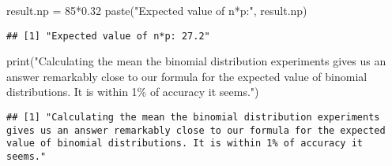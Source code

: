 \documentclass[
]{article}
\newenvironment{Shaded}{\begin{snugshade}}{\end{snugshade}}
\newcommand{\DecValTok}[1]{\textcolor[rgb]{0.00,0.00,0.81}{#1}}
\newcommand{\FloatTok}[1]{\textcolor[rgb]{0.00,0.00,0.81}{#1}}
\newcommand{\FunctionTok}[1]{\textcolor[rgb]{0.00,0.00,0.00}{#1}}
\newcommand{\NormalTok}[1]{#1}
\newcommand{\OtherTok}[1]{\textcolor[rgb]{0.56,0.35,0.01}{#1}}
\newcommand{\SpecialCharTok}[1]{\textcolor[rgb]{0.00,0.00,0.00}{#1}}
\newcommand{\StringTok}[1]{\textcolor[rgb]{0.31,0.60,0.02}{#1}}
\begin{document}
\begin{Shaded}
\begin{Highlighting}[]
\NormalTok{result.np }\OtherTok{=} \DecValTok{85}\SpecialCharTok{*}\FloatTok{0.32}
\FunctionTok{paste}\NormalTok{(}\StringTok{"Expected value of n*p:"}\NormalTok{,}
\NormalTok{result.np)}
\end{Highlighting}
\end{Shaded}

\begin{verbatim}
## [1] "Expected value of n*p: 27.2"
\end{verbatim}

\begin{Shaded}
\begin{Highlighting}[]
\FunctionTok{print}\NormalTok{(}\StringTok{"Calculating the mean the binomial distribution experiments gives us an answer remarkably close to our formula for the expected value of binomial distributions. It is within 1\% of accuracy it seems."}\NormalTok{)}
\end{Highlighting}
\end{Shaded}

\begin{verbatim}
## [1] "Calculating the mean the binomial distribution experiments gives us an answer remarkably close to our formula for the expected value of binomial distributions. It is within 1% of accuracy it seems."
\end{verbatim}
\end{document}
